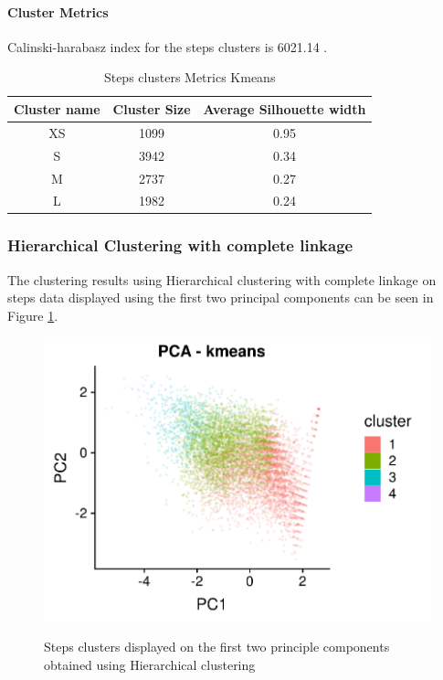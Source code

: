 \documentclass{article}
\begin{document}
\paragraph{Cluster Metrics}
Calinski-harabasz index for the steps clusters is 6021.14 .

\begin{table}[H]
  \caption{Steps clusters Metrics Kmeans}
  \label{steps_metrics}
  \centering
  \begin{tabular}{ c|c|c}
    \toprule
    \cmidrule(r){1-2}
    Cluster name & Cluster Size & Average Silhouette width \\
    \midrule
    XS & 1099 & 0.95 \\
    S & 3942 & 0.34 \\
    M & 2737 & 0.27 \\
    L & 1982 & 0.24 \\
    \bottomrule
    \end{tabular}
\end{table}

\subsubsection{Hierarchical Clustering with complete linkage}

The clustering results using Hierarchical clustering with complete linkage on steps data displayed using the first two principal components can be seen in Figure \ref{fig:stepsClustersHC}.

\begin{figure}[htb]
  \centering
  \caption{Steps clusters displayed on the first two principle components obtained using Hierarchical clustering}
  \includegraphics[]{steps_HC_results.png}
  \label{fig:stepsClustersHC}
\end{figure}
\end{document}
